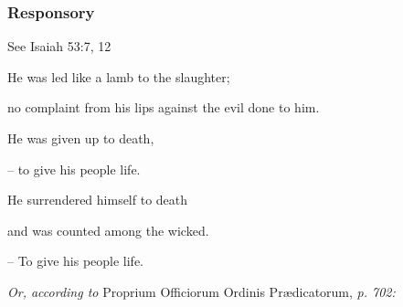 \subsubsection{Responsory}
\hfill See Isaiah 53:7, 12

\noindent He was led like a lamb to the slaughter;\par
\noindent no complaint from his lips against the evil done to him.\par
\noindent He was given up to death,\par
\noindent – to give his people life.\par
\vspace{5pt}
\noindent He surrendered himself to death\par
\noindent and was counted among the wicked.\par
\noindent – To give his people life.

\vpsace{5pt}
\textit{Or, according to} Proprium Officiorum Ordinis Prædicatorum, \textit{p. 702:}

